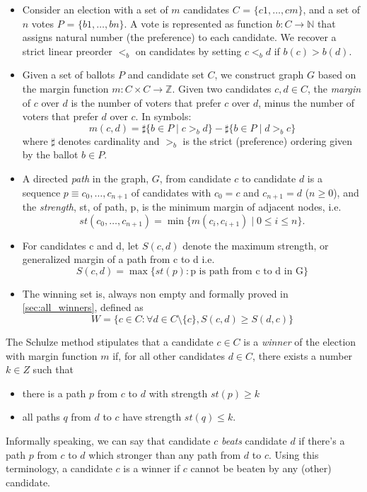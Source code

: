 \begin{itemize}

\item Consider an election with a set of $m$ candidates
 $C$ = $\{c1,\dots,cm\}$, and 
	a set of $n$ votes $P$ = $\{b1,\dots,bn\}$. A vote
	is represented as function $b: C \rightarrow \mathbb{N}$ that 
	assigns natural 
	number (the preference) to each candidate. We recover a strict linear  
	preorder $<_b$ on candidates by setting $c <_b d$ if $b(c) > b(d)$. 
	
\item Given a set of ballots $P$ and candidate set $C$, we construct graph $G$ based on the margin function $m: C \times C \to \mathbb{Z}$. Given two candidates $c, d \in C$,
the \emph{margin} of $c$ over $d$ is
the number of voters that prefer $c$ over $d$, minus the number of voters that prefer $d$ over $c$. 
In symbols:
\[
  m(c, d) = \sharp \lbrace b \in P \mid c >_b d \rbrace -
            \sharp \lbrace b \in P \mid d >_b c \rbrace
\] where $\sharp$ denotes cardinality and $>_b$ is the strict
(preference) ordering given by the ballot $b \in P$.





\item A directed \emph{path} in the graph, $G$, from
candidate $c$ to candidate $d$ is a sequence $p \equiv c_0, \dots, c_{n+1}$
of candidates with $c_0 = c$ and $c_{n+1} = d$ ($n \geq 0$), and the
\emph{strength}, st, of path, p, is the minimum margin of adjacent
nodes, i.e.
\[ st(c_0, \dots, c_{n+1}) = \min \lbrace m (c_i, c_{i+1}) \mid 0
\leq i \leq n \rbrace. \]
\item For candidates c and d, let $S(c, d)$ denote the maximum strength, or generalized margin of a path
	from c to d i.e. 
	\[ S(c, d) = \max \lbrace st (p) : \text{p is path from c to d in G} \rbrace\]
	
\item The winning set is, always non empty and  formally proved in \ref{sec:all_winners}, defined as 
 \[ W =  \lbrace c \in C : \forall d \in C \setminus \{c\}, S (c, d) \geq S (d, c) \rbrace\]

\end{itemize}

The Schulze method
stipulates that a candidate $c \in C$ is a \emph{winner} of the
election with margin function $m$ if, for all other candidates $d \in
C$, there exists a number $k \in Z$ such that
\begin{itemize}
\item there is a path $p$ from $c$ to $d$ with strength $st(p) \geq k$
\item all paths $q$ from $d$ to $c$ have strength $st(q) \leq k$.
\end{itemize}
Informally speaking, we can say that  candidate $c$
\emph{beats} candidate $d$ if there's a path $p$ from
$c$ to $d$ which stronger than any path from $d$ to $c$. Using
this terminology, a candidate $c$ is a winner if $c$ cannot be
beaten by any (other) candidate.


